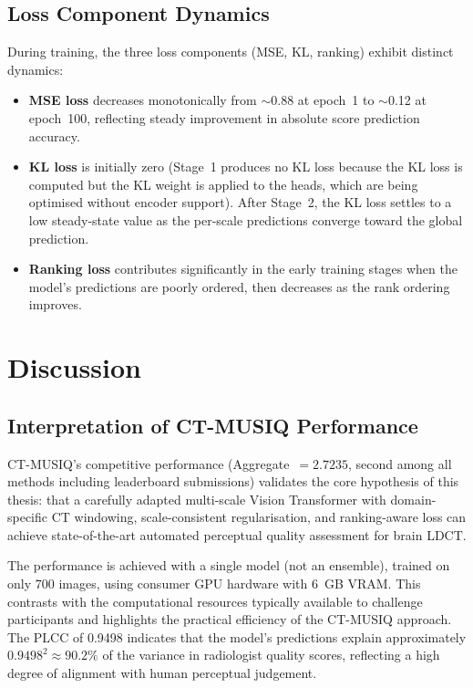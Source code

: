 \subsection{Loss Component Dynamics}

During training, the three loss components (MSE, KL, ranking) exhibit distinct dynamics:

\begin{itemize}
    \item \textbf{MSE loss} decreases monotonically from $\sim$0.88 at epoch~1 to
          $\sim$0.12 at epoch~100, reflecting steady improvement in absolute score
          prediction accuracy.
    \item \textbf{KL loss} is initially zero (Stage~1 produces no KL loss because
          the KL loss is computed but the KL weight is applied to the heads, which are
          being optimised without encoder support). After Stage~2, the KL loss settles
          to a low steady-state value as the per-scale predictions converge toward the
          global prediction.
    \item \textbf{Ranking loss} contributes significantly in the early training stages
          when the model's predictions are poorly ordered, then decreases as the rank
          ordering improves.
\end{itemize}


\section{Discussion}
\label{sec:results_discussion}

\subsection{Interpretation of CT-MUSIQ Performance}

CT-MUSIQ's competitive performance (Aggregate~$= 2.7235$, second among all methods
including leaderboard submissions) validates the core hypothesis of this thesis: that a
carefully adapted multi-scale Vision Transformer with domain-specific CT windowing,
scale-consistent regularisation, and ranking-aware loss can achieve state-of-the-art
automated perceptual quality assessment for brain LDCT.

The performance is achieved with a single model (not an ensemble), trained on only 700
images, using consumer GPU hardware with 6~GB VRAM. This contrasts with the computational
resources typically available to challenge participants and highlights the practical
efficiency of the CT-MUSIQ approach. The PLCC of 0.9498 indicates that the model's
predictions explain approximately $0.9498^2 \approx 90.2\%$ of the variance in radiologist
quality scores, reflecting a high degree of alignment with human perceptual judgement.

